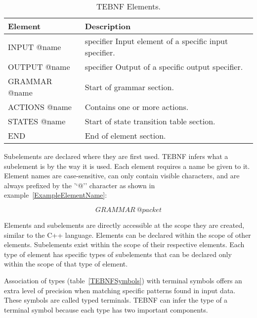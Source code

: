 \begin{table}[h!]
\begin{center}
\caption{TEBNF Elements.}
\label{TEBNFElements}
\begin{tabular}{|l|l|} \hline
\textbf{Element} & \textbf{Description} \\ \hline \hline
INPUT @name & specifier	Input element of a specific input specifier. \\ \hline
OUTPUT @name & specifier	Output of a specific output specifier. \\ \hline
GRAMMAR @name & Start of grammar section. \\ \hline
ACTIONS @name & Contains one or more actions. \\ \hline
STATES @name & Start of state transition table section. \\ \hline
END	& End of element section. \\ \hline
\end{tabular}
\end{center}
\end{table}

\indent
Subelements are declared where they are first used.  TEBNF infers what a subelement is by the way it is used.  Each element requires a name be given to it.  Element names are case-sensitive, can only contain visible characters, and are always prefixed by the '‘@'’ character as shown in example~\ref{ExampleElementName}:

\begin{equation}
GRAMMAR \ @packet
\label{ExampleElementName}
\end{equation}

\label{sec:TEBNFScopingRules}
Elements and subelements are directly accessible at the scope they are created, similar to the C++ language.  Elements can be declared within the scope of other elements.  Subelements exist within the scope of their respective elements.  Each type of element has specific types of subelements that can be declared only within the scope of that type of element.

\label{sec:TEBNFTypes}
Association of types (table~\ref{TEBNFSymbols}) with terminal symbols offers an extra level of precision when matching specific patterns found in input data.  These symbols are called typed terminals.  TEBNF can infer the type of a terminal symbol because each type has two important components.

